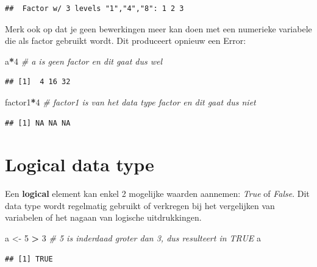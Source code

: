 \documentclass[
]{book}
\newenvironment{Shaded}{\begin{snugshade}}{\end{snugshade}}
\newcommand{\CommentTok}[1]{\textcolor[rgb]{0.56,0.35,0.01}{\textit{#1}}}
\newcommand{\DecValTok}[1]{\textcolor[rgb]{0.00,0.00,0.81}{#1}}
\newcommand{\NormalTok}[1]{#1}
\newcommand{\OtherTok}[1]{\textcolor[rgb]{0.56,0.35,0.01}{#1}}
\newcommand{\SpecialCharTok}[1]{\textcolor[rgb]{0.81,0.36,0.00}{\textbf{#1}}}
\begin{document}
\begin{verbatim}
##  Factor w/ 3 levels "1","4","8": 1 2 3
\end{verbatim}

Merk ook op dat je geen bewerkingen meer kan doen met een numerieke variabele die als factor gebruikt wordt. Dit produceert opnieuw een Error:

\begin{Shaded}
\begin{Highlighting}[]
\NormalTok{a}\SpecialCharTok{*}\DecValTok{4} \CommentTok{\# a is geen factor en dit gaat dus wel}
\end{Highlighting}
\end{Shaded}

\begin{verbatim}
## [1]  4 16 32
\end{verbatim}

\begin{Shaded}
\begin{Highlighting}[]
\NormalTok{factor1}\SpecialCharTok{*}\DecValTok{4} \CommentTok{\# factor1 is van het data type factor en dit gaat dus niet}
\end{Highlighting}
\end{Shaded}

\begin{verbatim}
## [1] NA NA NA
\end{verbatim}

\hypertarget{logical-data-type}{%
\section{Logical data type}\label{logical-data-type}}

Een \textbf{logical} element kan enkel 2 mogelijke waarden aannemen: \emph{True} of \emph{False}. Dit data type wordt regelmatig gebruikt of verkregen bij het vergelijken van variabelen of het nagaan van logische uitdrukkingen.

\begin{Shaded}
\begin{Highlighting}[]
\NormalTok{a }\OtherTok{\textless{}{-}} \DecValTok{5} \SpecialCharTok{\textgreater{}} \DecValTok{3} \CommentTok{\# 5 is inderdaad groter dan 3, dus resulteert in \textquotesingle{}TRUE\textquotesingle{}}
\NormalTok{a}
\end{Highlighting}
\end{Shaded}

\begin{verbatim}
## [1] TRUE
\end{verbatim}
\end{document}
